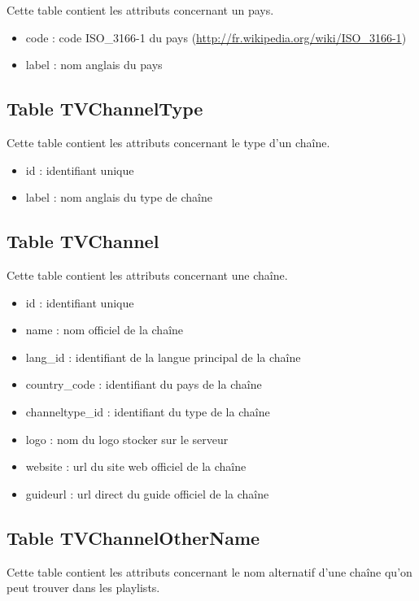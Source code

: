 \documentclass[10pt,a4paper]{article}
\begin{document}
Cette table contient les attributs concernant un pays.

\begin{itemize}
\item code : code ISO\_3166-1 du pays (\url{http://fr.wikipedia.org/wiki/ISO\_3166-1})
\item label : nom anglais du pays
\end{itemize}

\subsection{Table TVChannelType}

Cette table contient les attributs concernant le type d'un chaîne.

\begin{itemize}
\item id : identifiant unique
\item label : nom anglais du type de chaîne
\end{itemize}

\subsection{Table TVChannel}

Cette table contient les attributs concernant une chaîne.

\begin{itemize}
\item id : identifiant unique
\item name : nom officiel de la chaîne
\item lang\_id : identifiant de la langue principal de la chaîne
\item country\_code : identifiant du pays de la chaîne
\item channeltype\_id : identifiant du type de la chaîne
\item logo : nom du logo stocker sur le serveur
\item website : url du site web officiel de la chaîne
\item guideurl : url direct du guide officiel de la chaîne
\end{itemize}

\subsection{Table TVChannelOtherName}

Cette table contient les attributs concernant le nom alternatif d'une chaîne qu'on peut trouver dans les playlists.
\end{document}
